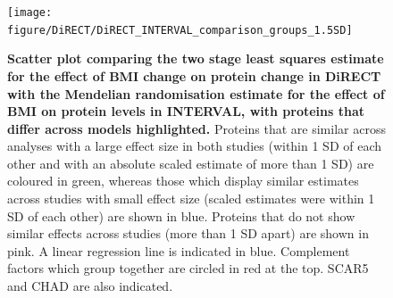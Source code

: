 \documentclass[11pt,twoside]{bristolthesis}
\newcommand{\blandscape}{\begin{landscape}}
\newcommand{\elandscape}{\end{landscape}}
\begin{document}
\blandscape



\begin{figure}

{\centering \texttt{[image: figure/DiRECT/DiRECT\_INTERVAL\_comparison\_groups\_1.5SD]} 

}

\caption[Scatter plot comparing the two stage least squares estimate for the effect of BMI change on protein change in DiRECT with the Mendelian randomisation estimate for the effect of BMI on protein levels in INTERVAL, with proteins that differ across models highlighted]{\textbf{Scatter plot comparing the two stage least squares estimate for the effect of BMI change on protein change in DiRECT with the Mendelian randomisation estimate for the effect of BMI on protein levels in INTERVAL, with proteins that differ across models highlighted.} Proteins that are similar across analyses with a large effect size in both studies (within 1 SD of each other and with an absolute scaled estimate of more than 1 SD) are coloured in green, whereas those which display similar estimates across studies with small effect size (scaled estimates were within 1 SD of each other) are shown in blue. Proteins that do not show similar effects across studies (more than 1 SD apart) are shown in pink. A linear regression line is indicated in blue. Complement factors which group together are circled in red at the top. SCAR5 and CHAD are also indicated.}\label{fig:DiRECT-INTERVAL-group}
\end{figure}
\elandscape
\end{document}
